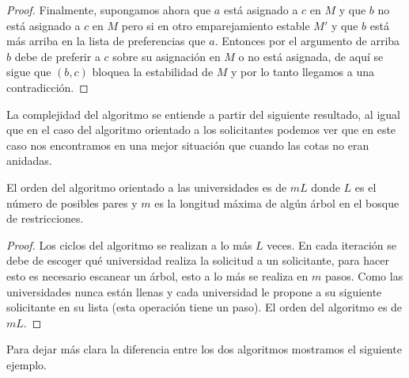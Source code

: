 \begin{proof}
Finalmente, supongamos ahora que $a$ está asignado a $c$ en $M$ y que $b$ no está asignado a $c$ en $M$ pero si en otro emparejamiento estable $M'$ y que $b$ está más arriba en la lista de preferencias que $a$. Entonces por el argumento de arriba $b$ debe de preferir a $c$ sobre su asignación en $M$ o no está asignada, de aquí se sigue que $(b,c)$ bloquea la estabilidad de $M$ y por lo tanto llegamos a una contradicción. 
\end{proof}

La complejidad del algoritmo se entiende a partir del siguiente resultado, al igual que en el caso del algoritmo orientado a los solicitantes podemos ver que en este caso nos encontramos en una mejor situación que cuando las cotas no eran anidadas. 

\begin{teo}
El orden del algoritmo orientado a las universidades es de $mL$ donde $L$ es el número de posibles pares y $m$ es la longitud máxima de algún árbol en el bosque de restricciones. 
\end{teo}

\begin{proof}
Los ciclos del algoritmo se realizan a lo más $L$ veces. En cada iteración se debe de escoger qué universidad realiza la solicitud a un solicitante, para hacer esto es necesario escanear un árbol, esto a lo más se realiza en $m$ pasos. Como las universidades nunca están llenas y cada universidad le propone a su siguiente solicitante en su lista (esta operación tiene un paso). El orden del algoritmo es de $mL$.
\end{proof}

Para dejar más clara la diferencia entre los dos algoritmos mostramos el siguiente ejemplo.


